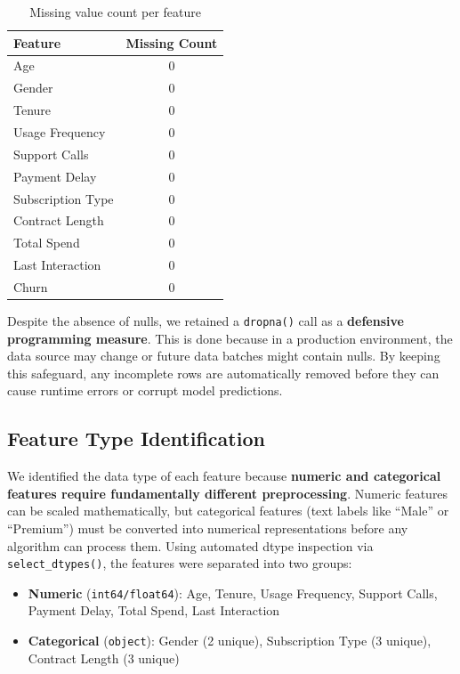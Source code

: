\documentclass[12pt, a4paper]{article}
\begin{document}
\begin{table}[H]
\centering
\caption{Missing value count per feature}
\label{tab:missing}
\begin{tabular}{@{} l c @{}}
\toprule
\textbf{Feature} & \textbf{Missing Count} \\
\midrule
Age & 0 \\
Gender & 0 \\
Tenure & 0 \\
Usage Frequency & 0 \\
Support Calls & 0 \\
Payment Delay & 0 \\
Subscription Type & 0 \\
Contract Length & 0 \\
Total Spend & 0 \\
Last Interaction & 0 \\
Churn & 0 \\
\bottomrule
\end{tabular}
\end{table}

Despite the absence of nulls, we retained a \texttt{dropna()} call as a \textbf{defensive programming measure}. This is done because in a production environment, the data source may change or future data batches might contain nulls. By keeping this safeguard, any incomplete rows are automatically removed before they can cause runtime errors or corrupt model predictions.

\subsection{Feature Type Identification}

We identified the data type of each feature because \textbf{numeric and categorical features require fundamentally different preprocessing}. Numeric features can be scaled mathematically, but categorical features (text labels like ``Male'' or ``Premium'') must be converted into numerical representations before any algorithm can process them. Using automated dtype inspection via \texttt{select\_dtypes()}, the features were separated into two groups:

\begin{itemize}
    \item \textbf{Numeric} (\texttt{int64/float64}): Age, Tenure, Usage Frequency, Support Calls, Payment Delay, Total Spend, Last Interaction
    \item \textbf{Categorical} (\texttt{object}): Gender (2 unique), Subscription Type (3 unique), Contract Length (3 unique)
\end{itemize}
\end{document}
